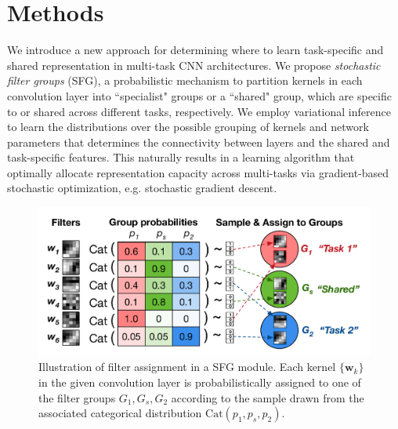         

\section{Methods}
We introduce a new approach for determining where to learn task-specific and shared representation in multi-task CNN architectures. We propose \textit{stochastic filter groups} (SFG), a probabilistic mechanism to partition kernels in each convolution layer into ``specialist" groups or a ``shared" group, which are specific to or shared across different tasks, respectively. We employ variational inference to learn the distributions over the possible grouping of kernels and network parameters that determines the connectivity between layers and the shared and task-specific features. This naturally results in a learning algorithm that optimally allocate representation capacity across multi-tasks via gradient-based stochastic optimization, e.g. stochastic gradient descent. 


\begin{figure}[ht]
	\center
	\includegraphics[width=0.85\linewidth]{chapter_6/figures/sfg_figure_02.pdf}
	\caption{\footnotesize Illustration of filter assignment in a SFG module. Each kernel $\{\mathbf{w}_{k}\}$ in the given convolution layer is probabilistically assigned to one of the filter groups $G_1, G_{s}, G_{2}$ according to the sample drawn from the associated categorical distribution $\text{Cat}(p_1, p_{s}, p_2)$. }
    \label{fig:sfg}
\end{figure}

